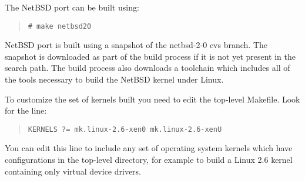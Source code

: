 The NetBSD port can be built using:
\begin{quote}
\begin{verbatim}
# make netbsd20
\end{verbatim}\end{quote}
NetBSD port is built using a snapshot of the netbsd-2-0 cvs branch.
The snapshot is downloaded as part of the build process if it is not
yet present in the  search path.  The build
process also downloads a toolchain which includes all of the tools
necessary to build the NetBSD kernel under Linux.

To customize the set of kernels built you need to edit the top-level
Makefile. Look for the line:
\begin{quote}
\begin{verbatim}
KERNELS ?= mk.linux-2.6-xen0 mk.linux-2.6-xenU
\end{verbatim}
\end{quote}

You can edit this line to include any set of operating system kernels
which have configurations in the top-level 
directory, for example  to build a Linux 2.6
kernel containing only virtual device drivers.




